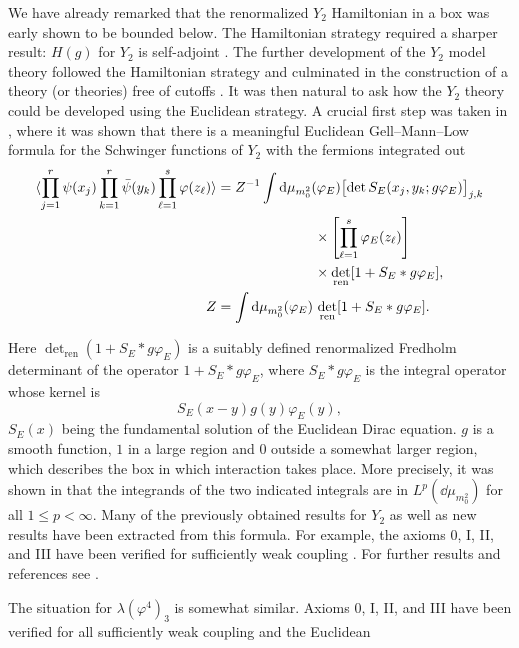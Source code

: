 We have already remarked that the renormalized $Y_2$ Hamiltonian in a box was
early shown to be bounded below. The Hamiltonian strategy required a sharper
result: $H(g)$ for $Y_2$ is self-adjoint \cite{pct-app-55}. The further development of the
$Y_2$ model theory followed the Hamiltonian strategy and culminated in the
construction of a theory (or theories) free of cutoffs \cite{pct-app-25,pct-app-26}. It was then
natural to ask how the $Y_2$ theory could be developed using the Euclidean
strategy. A crucial first step was taken in \cite{pct-app-57}, where it was shown that
there is a meaningful Euclidean Gell--Mann--Low formula for the Schwinger
functions of $Y_2$ with the fermions integrated out
\[
\begin{aligned}
  \langle \prod_{j=1}^{r}\psi(x_j)\prod_{k=1}^{r}\bar\psi(y_k)
      \prod_{\ell=1}^{s}\varphi(z_\ell)\rangle
  &={Z}^{-1}\int\mathop{}\!\mathrm{d}\mu_{m_0^2}(\varphi_E)
    \bigl[\det S_E(x_j,y_k;g\varphi_E)\bigr]_{j,k}\\
  &\hspace{7em}\times\left[\prod_{\ell=1}^{s}\varphi_E(z_\ell)\right]\\
  &\hspace{7em}\times\det_{\mathrm{ren}}[1+S_E*g\varphi_E],\\
  Z&=\int\mathop{}\!\mathrm{d}\mu_{m_0^2}(\varphi_E)\,
    \det_{\mathrm{ren}}[1+S_E*g\varphi_E].
\end{aligned}
\]

Here $\det_{\mathrm{ren}}(1+S_E*g\varphi_E)$ is a suitably defined
renormalized Fredholm determinant of the operator $1+S_E*g\varphi_E$, where
$S_E*g\varphi_E$ is the integral operator whose kernel is
\[
  S_E(x-y)g(y)\varphi_E(y),
\]
$S_E(x)$ being the fundamental solution of the Euclidean Dirac equation. $g$
is a smooth function, $1$ in a large region and $0$ outside a somewhat larger
region, which describes the box in which interaction takes place. More
precisely, it was shown in \cite{pct-app-57} that the integrands of the two indicated
integrals are in $L^p(\dd\mu_{m_0^2})$ for all $1\leq p<\infty$. Many of the
previously obtained results for $Y_2$ as well as new results have been
extracted from this formula. For example, the axioms 0, I, II, and III have
been verified for sufficiently weak coupling \cite{pct-app-58,pct-app-59}. For further results and
references see \cite{pct-app-60}.

The situation for $\lambda(\varphi^4)_3$ is somewhat similar. Axioms 0, I, II,
and III have been verified for all sufficiently weak coupling and the Euclidean
